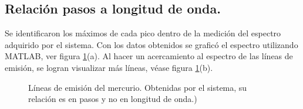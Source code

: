 \subsection{Relación pasos a longitud de onda.}

Se identificaron los  máximos de cada pico dentro de la medición del espectro adquirido por el sistema. Con los datos obtenidos se graficó el espectro utilizando MATLAB, ver figura \ref{fig:ms1-r}(a). Al hacer un acercamiento al espectro de las líneas de emisión, se logran visualizar más líneas, véase figura \ref{fig:ms1-r}(b). 



\begin{figure}[h]
	\centering
	\caption{Líneas de emisión del mercurio. Obtenidas por el sistema, su relación es en pasos y no en longitud de onda.)}
	\label{fig:ms1-r}
\end{figure}





